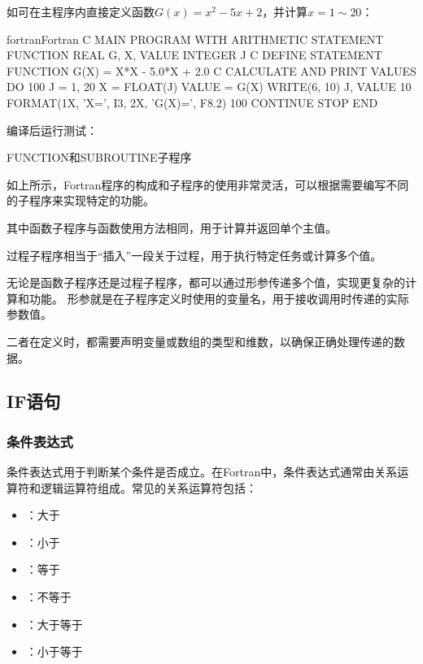 如可在主程序内直接定义函数$G(x)=x^2-5x+2$，并计算$x=1\sim{}20$：
\begin{envcode}{fortran}{Fortran}
C MAIN PROGRAM WITH ARITHMETIC STATEMENT FUNCTION
      REAL G, X, VALUE
      INTEGER J
C DEFINE STATEMENT FUNCTION
      G(X) = X*X - 5.0*X + 2.0
C CALCULATE AND PRINT VALUES
      DO 100 J = 1, 20
          X = FLOAT(J)
          VALUE = G(X)
          WRITE(6, 10) J, VALUE
10        FORMAT(1X, 'X=', I3, 2X, 'G(X)=', F8.2)
100   CONTINUE
      STOP
      END
\end{envcode}

编译后运行测试：

\begin{zj}
FUNCTION和SUBROUTINE子程序

如上所示，Fortran程序的构成和子程序的使用非常灵活，可以根据需要编写不同的子程序来实现特定的功能。

其中函数子程序与函数使用方法相同，用于计算并返回单个主值。

过程子程序相当于“插入”一段关于过程，用于执行特定任务或计算多个值。

无论是函数子程序还是过程子程序，都可以通过形参传递多个值，实现更复杂的计算和功能。
形参就是在子程序定义时使用的变量名，用于接收调用时传递的实际参数值。

二者在定义时，都需要声明变量或数组的类型和维数，以确保正确处理传递的数据。
\end{zj}

\subsection{IF语句}

\subsubsection{条件表达式}
条件表达式用于判断某个条件是否成立。在Fortran中，条件表达式通常由关系运算符和逻辑运算符组成。常见的关系运算符包括：
\begin{itemize}
    \item {}：大于
    \item {}：小于
    \item {}：等于
    \item {}：不等于
    \item {}：大于等于
    \item {}：小于等于
\end{itemize}

